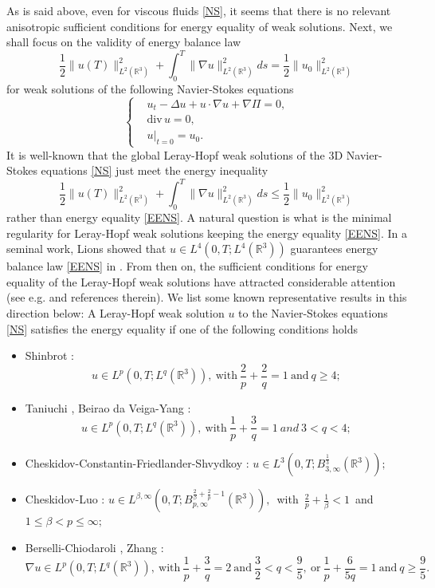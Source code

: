 \documentclass[11pt]{article}
\theoremstyle{plain}\newtheorem{definition}{Definition}[section]
\theoremstyle{definition}\newtheorem{theorem}{Theorem}[section]
\theoremstyle{plain}\newtheorem{lemma}[theorem]{Lemma}
\theoremstyle{plain}\newtheorem{coro}[theorem]{Corollary}
\theoremstyle{plain}\newtheorem{prop}[theorem]{Proposition}
\theoremstyle{remark}\newtheorem{remark}{Remark}[section]
\newcommand{\Div}{\mathrm{div}\,}
\newcommand{\be}{\begin{equation}}
\newcommand{\ee}{\end{equation}}
\newcommand{\ba}{\begin{aligned}}
\newcommand{\ea}{\end{aligned}}
\newcommand{\f}{\frac}
\newcommand{\ti}{\nabla}
\numberwithin{equation}{section}
\begin{document}
As is said above, even for   viscous fluids \eqref{NS},
it seems that there is no relevant  anisotropic sufficient conditions for energy equality of weak solutions. Next, we shall focus on the validity of energy balance law
\be\label{EENS}
 \f12\|u(T)\|_{L^{2}(\mathbb{R}^{3})}^{2}+  \int_{0}^{T}\|\nabla u\|_{L^{2}(\mathbb{R}^{3})}^{2}ds=
  \f12\|u_0\|_{L^{2}(\mathbb{R}^{3})}^{2}
 \ee
for weak solutions of the following Navier-Stokes equations
 \be\left\{\ba\label{NS}
&u_{t} -\Delta  u+ u\cdot\ti
u  +\nabla \Pi=0, \\
&\Div u=0,\\
&u|_{t=0}=u_0.
\ea\right.\ee
It is well-known that  the   global Leray-Hopf weak solutions of the 3D Navier-Stokes equations \eqref{NS} just meet
 the energy inequality
 \be\label{EINS}
 \f12\|u(T)\|_{L^{2}(\mathbb{R}^{3})}^{2}+  \int_{0}^{T}\|\nabla u\|_{L^{2}(\mathbb{R}^{3})}^{2}ds\leq \f12\|u_0\|_{L^{2}(\mathbb{R}^{3})}^{2}
 \ee
 rather than energy equality \eqref{EENS}. A natural question is what is the minimal regularity for Leray-Hopf weak solutions keeping the energy equality \eqref{EENS}.
 In a seminal work, Lions showed that $u\in L^{4}(0,T;L^{4}(\mathbb{R}^{3})) $ guarantees energy balance law  \eqref{EENS} in \cite{[Lions]}. From then on, the sufficient conditions for energy equality of the Leray-Hopf weak solutions
have attracted considerable attention (see e.g. \cite{[Lions],[Shinbrot],[BY],[CCFS],[CL],[BC],[Zhang],[Galdi]} and references therein). We list some known representative results in this direction below:
A Leray-Hopf weak solution $u$ to the Navier-Stokes equations \eqref{NS} satisfies the energy equality if one of the following conditions holds
\begin{itemize}
\item Shinbrot \cite{[Shinbrot]}:
\be\label{Shinb}
u\in L^{p}(0,T;L^{q}(\mathbb{R}^{3})),~\text{with}~\f{2}{p}+
 \f{2}{q}=1~\text{and}~q\geq 4;\ee
\item Taniuchi \cite{[Taniuchi]}, Beirao da Veiga-Yang \cite{[BY]}:
\be\label{tby}
u\in L^{p}(0,T;L^{q}(\mathbb{R}^{3})),~\text{with}~  \f{1}{p}+
 \f{3}{q}=1 ~and~ 3<q< 4;\ee
\item  Cheskidov-Constantin-Friedlander-Shvydkoy \cite{[CCFS]}: $u\in L^{3}(0,T;B^{\f13}_{3,\infty}(\mathbb{R}^{3}));$
\item Cheskidov-Luo \cite{[CL]}:   $u\in L^{\beta,\infty}(0,T;B^{\f2\beta+\f2p-1}_{p,\infty}(\mathbb{R}^{3})),$~with~$\f2p+\f1\beta<1$~and~$1\leq\beta<p\leq\infty;$
 \item Berselli-Chiodaroli  \cite{[BC]}, Zhang \cite{[Zhang]}:
\be\label{bcz}
\nabla u \in L^{p}\left(0, T ; L^{q}\left(\mathbb{R}^{3}\right)\right),~\text{with}~
\frac{1}{p}+\frac{3 }{q}=2~\text{and}~\frac{3 }{2}<q<\frac{9}{5},~\text{or}~
\frac{1}{p}+\frac{6}{5 q}=1~\text{and}~ q\geq\frac{9}{5}.\ee
   \end{itemize}
\end{document}
